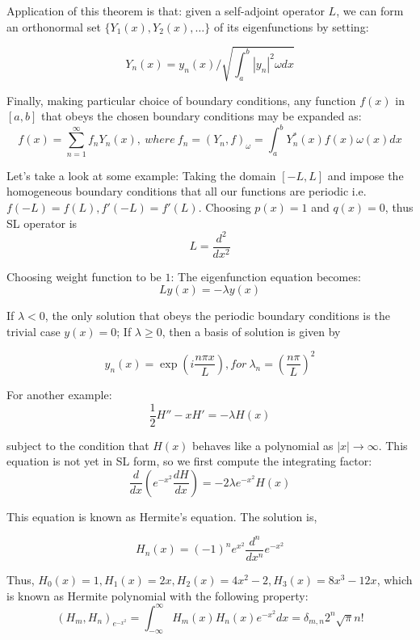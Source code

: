 \documentclass{article}
\theoremstyle{definition}
\begin{document}
Application of this theorem is that: given a self-adjoint operator $L$, we can form an orthonormal set $\{Y_1(x),Y_2(x),\ldots \}$ of its eigenfunctions by setting:

\begin{equation}
Y_n(x)=y_n(x)/\sqrt{\int_a^b |y_n|^2\omega dx}
\end{equation}

Finally, making particular choice of boundary conditions, any function $f(x)$ in $[a,b]$ that obeys the chosen boundary conditions may be expanded as:
\begin{equation}
f(x)=\sum_{n=1}^\infty f_n Y_n(x), \ where \ f_n=(Y_n,f)_\omega =\int_a^b Y_n^*(x)f(x)\omega (x)dx
\end{equation}

Let's take a look at some example:
Taking the domain $[-L,L]$ and impose the homogeneous boundary conditions that all our functions are periodic i.e. $f(-L)=f(L),f'(-L)=f'(L)$. Choosing $p(x)=1$ and $q(x)=0$, thus SL operator is
\begin{equation}
L=\frac{d^2}{dx^2}
\end{equation}

Choosing weight function to be $1$:
The eigenfunction equation becomes:
\begin{equation}
Ly(x)=-\lambda y(x)
\end{equation}

If $\lambda <0$, the only solution that obeys the periodic boundary conditions is the trivial case $y(x)=0$; If $\lambda \geq 0$, then a basis of solution is given by

\begin{equation}
y_n(x)=\exp(i \frac{n \pi x}{L}), for \ \lambda_n=\left(\frac{n\pi}{L}\right)^2
\end{equation}

For another example:
\begin{equation}
\frac{1}{2}H''-xH'=-\lambda H(x)
\end{equation}

subject to the condition that $H(x)$ behaves like a polynomial as $|x| \to \infty$. This equation is not yet in SL form, so we first compute the integrating factor:
\begin{equation}
\frac{d}{dx}\left(e^{-x^2}\frac{dH}{dx}\right)=-2\lambda e^{-x^2}H(x)
\end{equation}


This equation is known as Hermite's equation. The solution is,

\begin{equation}
H_n(x)=(-1)^ne^{x^2}\frac{d^n}{dx^n}e^{-x^2}
\end{equation}

Thus, $H_0(x)=1, H_1(x)=2x, H_2(x)=4x^2-2, H_3(x)=8x^3-12x$, which is known as Hermite polynomial with the following property:
\begin{equation}
(H_m,H_n)_{e^{-x^2}}=\int_{-\infty}^{\infty}H_m(x)H_n(x)e^{-x^2}dx=\delta_{m,n}2^n\sqrt{\pi}n!
\end{equation}
\end{document}
